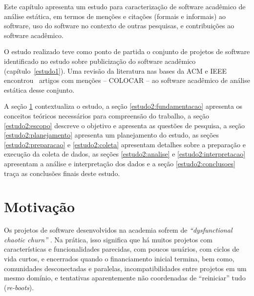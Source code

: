 {}\label{estudo2}





Este capítulo apresenta 
um estudo para caracterização de software acadêmico de análise estática,
em termos de 
menções e citações (formais e informais) ao software,
uso do software no contexto de outras pesquisas,
e contribuições ao software acadêmico.

O estudo realizado teve como ponto de partida 
o conjunto de projetos de software identificado 
no estudo sobre publicização do software acadêmico (capítulo~\ref{estudo1}).
Uma revisão da literatura nas bases da ACM e IEEE 
encontrou \SearchUniqueCount \ artigos com menções 
-- COLOCAR -- 
ao software acadêmico de análise estática 
desse conjunto.

A seção \ref{estudo2:introducao} contextualiza o estudo,
a seção \ref{estudo2:fundamentacao} apresenta os conceitos teóricos necessários para compreensão do trabalho,
a seção \ref{estudo2:escopo} descreve o objetivo e apresenta as questões de pesquisa,
a seção \ref{estudo2:planejamento} apresenta um planejamento do estudo,
as seções \ref{estudo2:preparacao} e \ref{estudo2:coleta} apresentam detalhes sobre a preparação e execução da coleta de dados,
as seções \ref{estudo2:analise} e \ref{estudo2:interpretacao} apresentam a análise e interpretação dos dados e
a seção \ref{estudo2:conclusoes} traça as conclusões finais deste estudo.

\section{Motivação} \label{estudo2:introducao} %

Os projetos de software desenvolvidos na academia sofrem de {\it
``dysfunctional chaotic churn''} \cite{howison2015understanding}.
Na prática, isso significa que há muitos projetos com características e
funcionalidades parecidas, com poucos usuários, com ciclos de vida curtos, e
encerrados quando o financiamento inicial termina, bem como, comunidades
desconectadas e paralelas, incompatibilidades entre projetos em um mesmo
domínio, e tentativas aparentemente não coordenadas de ``reiniciar'' tudo ({\it re-boots}). 

